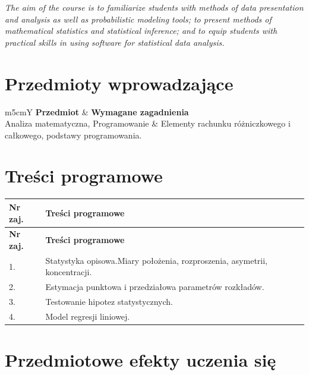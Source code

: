 \documentclass[12pt, a4paper]{article}
\newcommand{\thdrule}{\noalign{\global\setlength{\extrarowheight}{0pt}}}
\newcommand{\thdend}{\noalign{\global\setlength{\extrarowheight}{3pt}}}
\begin{document}
\textit{The aim of the course is to familiarize students with methods of data presentation and analysis as well as probabilistic modeling tools; to present methods of mathematical statistics and statistical inference; and to equip students with practical skills in using software for statistical data analysis.}


\section{Przedmioty wprowadzające}

{\scriptsize
\begin{tabularx}{\textwidth}{m{5cm}Y}
\thdrule\toprule
{} {\color{white}\textbf{Przedmiot}} & {\color{white}\textbf{Wymagane zagadnienia}} \\
\midrule\thdend
   Analiza matematyczna, Programowanie & Elementy rachunku różniczkowego i całkowego, podstawy programowania. \\
\bottomrule
\end{tabularx}}

\section{Treści programowe}

{\scriptsize
\begin{longtable}{m{1.5cm}m{14.5cm}}
\thdrule\toprule
\rowcolor{pjatkRed} {\color{white}\textbf{Nr zaj.}} & {\color{white}\textbf{Treści programowe}} \\
\midrule\thdend
\endfirsthead
\thdrule\toprule
\rowcolor{pjatkRed} {\color{white}\textbf{Nr zaj.}} & {\color{white}\textbf{Treści programowe}} \\
\midrule\thdend
\endhead
  \rowcolor{tableRowLight} 1. & Statystyka opisowa.Miary położenia, rozproszenia, asymetrii, koncentracji. \\
  \rowcolor{tableRowAlt} 2. & Estymacja punktowa i przedziałowa parametrów rozkładów. \\
  \rowcolor{tableRowLight} 3. & Testowanie hipotez statystycznych. \\
  \rowcolor{tableRowAlt} 4. & Model regresji liniowej. \\
\bottomrule
\end{longtable}}

\section{Przedmiotowe efekty uczenia się}
\end{document}
